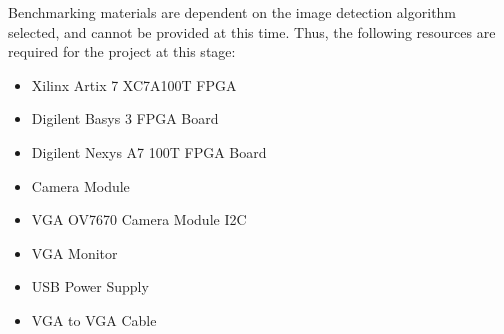 Benchmarking materials are dependent on the image detection algorithm selected, and cannot be provided at this time. Thus, the following resources are required for the project at this stage:

\begin{itemize}
    \item Xilinx Artix 7 XC7A100T FPGA
    \item Digilent Basys 3 FPGA Board
    \item Digilent Nexys A7 100T FPGA Board
    \item Camera Module
    \item VGA OV7670 Camera Module I2C
    \item VGA Monitor
    \item USB Power Supply
    \item VGA to VGA Cable
\end{itemize}